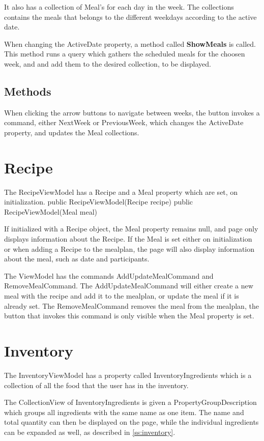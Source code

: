 It also has a collection of Meal's for each day in the week. The collections contains the meals that belongs to the different weekdays according to the active date.

When changing the ActiveDate property, a method called \textbf{ShowMeals} is called. This method runs a query which gathers the scheduled meals for the choosen week, and and add them to the desired collection, to be displayed. 

\subsection{Methods}
When clicking the arrow buttons to navigate between weeks, the button invokes a command, either NextWeek or PreviousWeek, which changes the ActiveDate property, and updates the Meal collections.


\section{Recipe}

The RecipeViewModel has a Recipe and a Meal property which are set, on initialization. 
        public RecipeViewModel(Recipe recipe)
        public RecipeViewModel(Meal meal)

If initialized with a Recipe object, the Meal property remains null, and page only displays information about the Recipe. If the Meal is set either on initialization or when adding a Recipe to the mealplan, the page will also display information about the meal, such as date and participants.

The ViewModel has the commands AddUpdateMealCommand and RemoveMealCommand. The AddUpdateMealCommand will either create a new meal with the recipe and add it to the mealplan, or update the meal if it is already set.
The RemoveMealCommand removes the meal from the mealplan, the button that invokes this command is only visible when the Meal property is set.


\section{Inventory}
The InventoryViewModel has a property called InventoryIngredients which is a collection of all the food that the user has in the inventory.

The CollectionView of InventoryIngredients is given a PropertyGroupDescription which groups all ingredients with the same name as one item. The name and total quantity can then be displayed on the page, while the individual ingredients can be expanded as well, as described in \cref{ss:inventory}.

